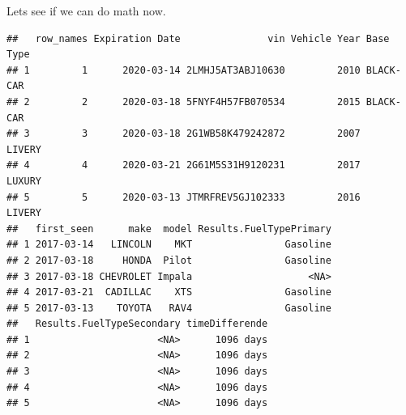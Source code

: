 \documentclass[]{book}
\newenvironment{Shaded}{\begin{snugshade}}{\end{snugshade}}
\newcommand{\CommentTok}[1]{\textcolor[rgb]{0.56,0.35,0.01}{\textit{#1}}}
\newcommand{\DataTypeTok}[1]{\textcolor[rgb]{0.13,0.29,0.53}{#1}}
\newcommand{\DecValTok}[1]{\textcolor[rgb]{0.00,0.00,0.81}{#1}}
\newcommand{\KeywordTok}[1]{\textcolor[rgb]{0.13,0.29,0.53}{\textbf{#1}}}
\newcommand{\NormalTok}[1]{#1}
\newcommand{\OperatorTok}[1]{\textcolor[rgb]{0.81,0.36,0.00}{\textbf{#1}}}
\newcommand{\StringTok}[1]{\textcolor[rgb]{0.31,0.60,0.02}{#1}}
\begin{document}
\begin{Shaded}
\end{Shaded}

\begin{Shaded}
\end{Shaded}

Lets see if we can do math now.

\begin{Shaded}
\end{Shaded}

\begin{verbatim}
##   row_names Expiration Date               vin Vehicle Year Base Type
## 1         1      2020-03-14 2LMHJ5AT3ABJ10630         2010 BLACK-CAR
## 2         2      2020-03-18 5FNYF4H57FB070534         2015 BLACK-CAR
## 3         3      2020-03-18 2G1WB58K479242872         2007    LIVERY
## 4         4      2020-03-21 2G61M5S31H9120231         2017    LUXURY
## 5         5      2020-03-13 JTMRFREV5GJ102333         2016    LIVERY
##   first_seen      make  model Results.FuelTypePrimary
## 1 2017-03-14   LINCOLN    MKT                Gasoline
## 2 2017-03-18     HONDA  Pilot                Gasoline
## 3 2017-03-18 CHEVROLET Impala                    <NA>
## 4 2017-03-21  CADILLAC    XTS                Gasoline
## 5 2017-03-13    TOYOTA   RAV4                Gasoline
##   Results.FuelTypeSecondary timeDifferende
## 1                      <NA>      1096 days
## 2                      <NA>      1096 days
## 3                      <NA>      1096 days
## 4                      <NA>      1096 days
## 5                      <NA>      1096 days
\end{verbatim}
\end{document}
